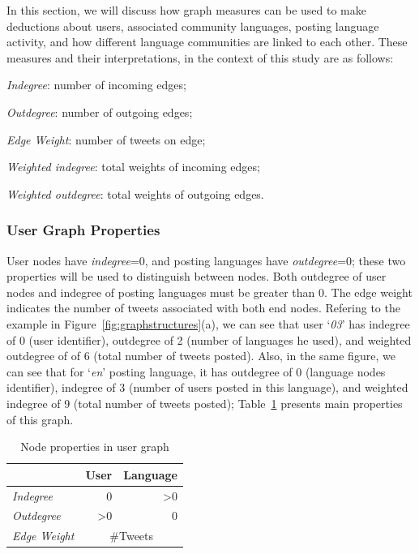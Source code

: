 \documentclass{llncs}
\begin{document}
In this section, we will discuss how graph measures can be used to
make deductions about users, associated community languages, posting
language activity, and how different language communities are linked
to each other.  These measures and their interpretations, in the
context of this study are as follows:\\

\begin{compactitem}
\item \emph{Indegree}: number of incoming edges;
\item \emph{Outdegree}: number of outgoing edges;
\item \emph{Edge Weight}: number of tweets on edge;
\item \emph{Weighted indegree}: total weights of incoming edges;
\item \emph{Weighted outdegree}: total weights of outgoing edges.
\end{compactitem}

\subsubsection{User Graph Properties}

User nodes have {\emph{indegree}}=0, and posting languages have
{\emph{outdegree}}=0; these two properties will be used to distinguish
between nodes. Both outdegree of user nodes and indegree of posting
languages must be greater than 0. The edge weight indicates the number
of tweets associated with both end nodes.  Refering to the example in
Figure~\ref{fig:graphstructures}(a), we can see that user
`{\emph{03}}' has indegree of 0 (user identifier), outdegree of 2
(number of languages he used), and weighted outdegree of of 6 (total
number of tweets posted). Also, in the same figure, we can see that
for `{\emph{en}}' posting language, it has outdegree of 0 (language
nodes identifier), indegree of 3 (number of users posted in this
language), and weighted indegree of 9 (total number of tweets posted);
Table~\ref{tbl:usersgraph} presents main properties of this graph.

\begin{table}[!htb]
\centering
\begin{tabular}{@{}lrr@{}}
\toprule
\textbf{}& \textbf{User} & \textbf{Language} \\ \midrule
{\emph{Indegree}} & 0 & \textgreater0 \\
{\emph{Outdegree}} & \textgreater0 & 0 \\ 
{\emph{Edge Weight}}& \multicolumn{2}{c}{\#Tweets}\\ \bottomrule
\end{tabular}
\caption{Node properties in user graph}
\label{tbl:usersgraph}
\end{table}
\end{document}
